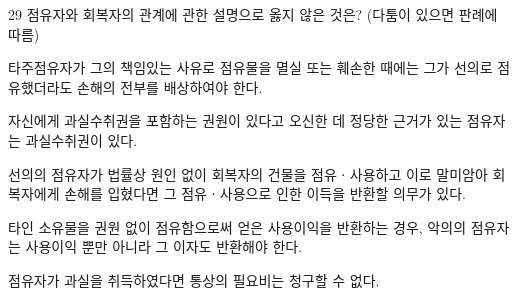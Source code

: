 \begin{question}{29}
점유자와 회복자의 관계에 관한 설명으로 옳지 않은 것은? (다툼이 있으면 판례에 따름)
\begin{choices}
  \item 타주점유자가 그의 책임있는 사유로 점유물을 멸실 또는 훼손한 때에는 그가 선의로 점유했더라도 손해의 전부를 배상하여야 한다.
  \item 자신에게 과실수취권을 포함하는 권원이 있다고 오신한 데 정당한 근거가 있는 점유자는 과실수취권이 있다.
  \item 선의의 점유자가 법률상 원인 없이 회복자의 건물을 점유ㆍ사용하고 이로 말미암아 회복자에게 손해를 입혔다면 그 점유ㆍ사용으로 인한 이득을 반환할 의무가 있다.
  \item 타인 소유물을 권원 없이 점유함으로써 얻은 사용이익을 반환하는 경우, 악의의 점유자는 사용이익 뿐만 아니라 그 이자도 반환해야 한다.
  \item 점유자가 과실을 취득하였다면 통상의 필요비는 청구할 수 없다.
\end{choices}
\end{question}
